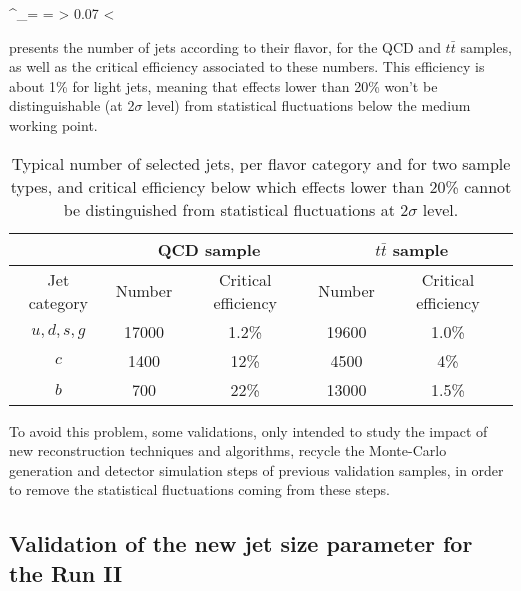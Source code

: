     {
        \sigma^_\epsilon = \frac{\sigma_\epsilon}{\epsilon} =  > 0.07
        \hspace*{1cm}
        \Rightarrow
        \hspace*{1cm}
        \epsilon < 
    }

     presents the number of jets according to
    their flavor, for the QCD and $t\bar{t}$ samples, as well as the critical
    efficiency associated to these numbers. This efficiency is about 1\% for
    light jets, meaning that effects lower than 20\% won't be distinguishable
    (at 2$\sigma$ level) from statistical fluctuations below the medium working
    point.

    \begin{table}
    \centering
    \begin{tabular}{|c|cc|cc|}
        \hline
                         & \multicolumn{2}{c}{QCD sample} & \multicolumn{2}{c}{$t\bar{t}$ sample} \\
        \hline
           Jet category  & Number & Critical efficiency   & Number & Critical efficiency \\
        \hline
            $u,d,s,g$    & 17000  & 1.2\%                 & 19600  & 1.0\% \\
            $c$          & 1400   & 12\%                  & 4500   & 4\%   \\
            $b$          & 700    & 22\%                  & 13000  & 1.5\% \\
        \hline
    \end{tabular}
        \caption{Typical number of selected jets, per flavor category and for
        two sample types, and critical efficiency below which effects lower than
        20\% cannot be distinguished from statistical fluctuations at 2$\sigma$
        level. \label{tab:criticalEfficiencyBTag}}
    \end{table}

    To avoid this problem, some validations, only intended to study the impact
    of new reconstruction techniques and algorithms, recycle the Monte-Carlo
    generation and detector simulation steps of previous validation samples, in
    order to remove the statistical fluctuations coming from these steps.

    \subsection{Validation of the new jet size parameter for the Run II}

